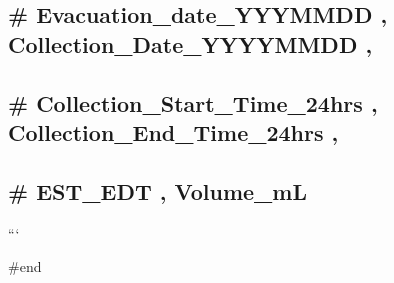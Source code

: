 \documentclass[
]{article}
\begin{document}
\hypertarget{evacuation_date_yyymmdd-collection_date_yyyymmdd}{%
\subsection{\# Evacuation\_date\_YYYMMDD , Collection\_Date\_YYYYMMDD
,}\label{evacuation_date_yyymmdd-collection_date_yyyymmdd}}

\hypertarget{collection_start_time_24hrs-collection_end_time_24hrs}{%
\subsection{\# Collection\_Start\_Time\_24hrs ,
Collection\_End\_Time\_24hrs
,}\label{collection_start_time_24hrs-collection_end_time_24hrs}}

\hypertarget{est_edt-volume_ml}{%
\subsection{\texorpdfstring{\# EST\_EDT , Volume\_mL
}{\# EST\_EDT , Volume\_mL }}\label{est_edt-volume_ml}}

```

\#end
\end{document}
